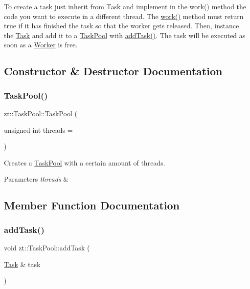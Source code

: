 To create a task just inherit from \hyperlink{classzt_1_1_task}{Task} and implement in the \hyperlink{classzt_1_1_task_pool_a1b03b3bf318d4873e9109cd6c9ba43b4}{work()} method the code you want to execute in a different thread. The \hyperlink{classzt_1_1_task_pool_a1b03b3bf318d4873e9109cd6c9ba43b4}{work()} method must return true if it has finished the task so that the worker gets released. Then, instance the \hyperlink{classzt_1_1_task}{Task} and add it to a \hyperlink{classzt_1_1_task_pool}{Task\+Pool} with \hyperlink{classzt_1_1_task_pool_a966bbcbfbc550c1324772d90c1c70f1b}{add\+Task()}. The task will be executed as soon as a \hyperlink{classzt_1_1_worker}{Worker} is free. 

\subsection{Constructor \& Destructor Documentation}
\mbox{\label{classzt_1_1_task_pool_a20b14ff66aaf67a035dd7394e7266ee0}} 
\subsubsection{\texorpdfstring{Task\+Pool()}{TaskPool()}}
{\footnotesize\ttfamily zt\+::\+Task\+Pool\+::\+Task\+Pool (\begin{DoxyParamCaption}\item[{unsigned int}]{threads = {} }\end{DoxyParamCaption})}

Creates a \hyperlink{classzt_1_1_task_pool}{Task\+Pool} with a certain amount of threads. 
\begin{DoxyParams}{Parameters}
{\em threads} & \\
\hline
\end{DoxyParams}


\subsection{Member Function Documentation}
\mbox{\label{classzt_1_1_task_pool_a966bbcbfbc550c1324772d90c1c70f1b}} 
\subsubsection{\texorpdfstring{add\+Task()}{addTask()}}
{\footnotesize\ttfamily void zt\+::\+Task\+Pool\+::add\+Task (\begin{DoxyParamCaption}\item[{\hyperlink{classzt_1_1_task}{Task} \&}]{task }\end{DoxyParamCaption})}


